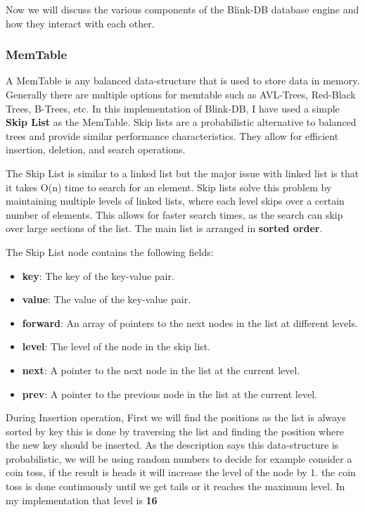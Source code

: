 \documentclass{article}
\begin{document}
\noindent Now we will discuss the various components of the Blink-DB database engine and how they interact with each other.

\subsubsection{MemTable}

A MemTable is any balanced data-structure that is used to store data in memory. Generally there are multiple options for memtable such as AVL-Trees, Red-Black Trees, B-Trees, etc. In this implementation of Blink-DB, I have used a simple \textbf{Skip List} as the MemTable. Skip lists are a probabilistic alternative to balanced trees and provide similar performance characteristics. They allow for efficient insertion, deletion, and search operations.

\noindent The Skip List is similar to a linked list but the major issue with linked list is that it takes O(n) time to search for an element. Skip lists solve this problem by maintaining multiple levels of linked lists, where each level skips over a certain number of elements. This allows for faster search times, as the search can skip over large sections of the list. The main list is arranged in \textbf{sorted order}.

\noindent The Skip List node contains the following fields:
\begin{itemize}
    \item \textbf{key}: The key of the key-value pair.
    \item \textbf{value}: The value of the key-value pair.
    \item \textbf{forward}: An array of pointers to the next nodes in the list at different levels.
    \item \textbf{level}: The level of the node in the skip list.
    \item \textbf{next}: A pointer to the next node in the list at the current level.
    \item \textbf{prev}: A pointer to the previous node in the list at the current level.
\end{itemize}

\noindent During Insertion operation, First we will find the positions as the list is always sorted by key this is done by traversing the list and finding the position where the new key should be inserted. As the description says this data-structure is probabilistic, we will be using random numbers to decide for example consider a coin toss, if the result is heads it will increase the level of the node by 1. the coin toss is done continuously until we get tails or it reaches the maximum level. In my implementation that level is \textbf{16}
\end{document}
